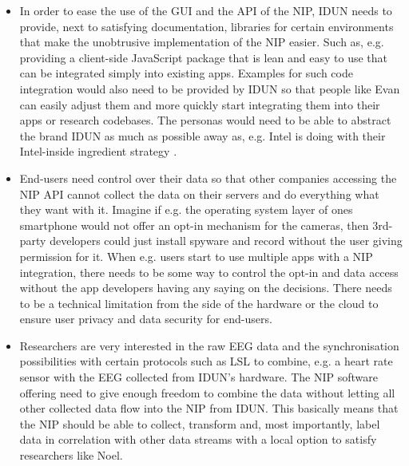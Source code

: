 \begin{itemize}
  \item In order to ease the use of the GUI and the API of the NIP, IDUN needs to provide, next to satisfying documentation, libraries for certain environments that make the unobtrusive implementation of the NIP easier. Such as, e.g. providing a client-side JavaScript package that is lean and easy to use that can be integrated simply into existing apps. Examples for such code integration would also need to be provided by IDUN so that people like Evan can easily adjust them and more quickly start integrating them into their apps or research codebases. The personas would need to be able to abstract the brand IDUN as much as possible away as, e.g. Intel is doing with their Intel-inside ingredient strategy \citep{intel_ingredient_nodate}.
  \item End-users need control over their data so that other companies accessing the NIP API cannot collect the data on their servers and do everything what they want with it. Imagine if e.g. the operating system layer of ones smartphone would not offer an opt-in mechanism for the cameras, then 3rd-party developers could just install spyware and record without the user giving permission for it. When e.g. users start to use multiple apps with a NIP integration, there needs to be some way to control the opt-in and data access without the app developers having any saying on the decisions. There needs to be a technical limitation from the side of the hardware or the cloud to ensure user privacy and data security for end-users.
  \item Researchers are very interested in the raw EEG data and the synchronisation possibilities with certain protocols such as LSL to combine, e.g. a heart rate sensor with the EEG collected from IDUN's hardware. The NIP software offering need to give enough freedom to combine the data without letting all other collected data flow into the NIP from IDUN. This basically means that the NIP should be able to collect, transform and, most importantly, label data in correlation with other data streams with a local option to satisfy researchers like Noel.
\end{itemize}

